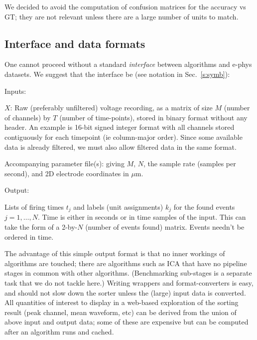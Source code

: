 \documentclass[10pt]{article}
\begin{document}
We decided to avoid the computation of confusion matrices for the accuracy
vs GT; they are not relevant unless there are a large number of units to match.

\subsection{Interface and data formats}
\label{s:int}

One cannot proceed without a
standard {\em interface} between algorithms and e-phys datasets.
We suggest that the interface be (see notation in Sec.~\ref{s:symb}):

\vspace{2ex}

\begin{minipage}[t]{1in}Inputs:\end{minipage} \begin{minipage}[t]{5in}
  $X$: Raw (preferably unfiltered)
  voltage recording, as a matrix of size $M$ (number of channels) by
  $T$ (number of
    time-points), stored in binary format without any header.
  An example is 16-bit signed integer format
  with all channels stored
  contiguously for each timepoint (ie column-major order).
  Since some available data is already filtered, we must also allow
  filtered data in the same format.

  Accompanying parameter file(s): giving $M$, $N$,
  the sample rate (samples per second), and 2D electrode coordinates in $\mu$m.
  \end{minipage}

\begin{minipage}[t]{1in}Output:\end{minipage} \begin{minipage}[t]{5in}
  Lists of firing times $t_j$ and labels (unit assignments) $k_j$
  for the found events $j=1,\ldots,N$. Time is either in seconds or in
  time samples of the input.
  This can take the form of a 2-by-$N$ (number of events found) matrix.
  Events needn't be ordered in time.
\end{minipage}

\vspace{2ex}

The advantage of this simple output format
is that no inner workings of algorithms are touched;
there are algorithms such as ICA that have no pipeline stages
in common with other algorithms. (Benchmarking sub-stages is a separate
task that we do not tackle here.)
Writing wrappers and format-converters is easy, and should not
slow down the sorter unless the (large) input data is converted.
All quantities of interest to display in a web-based exploration
of the sorting result (peak channel, mean waveform, etc)
can be derived from the union of above input and output data;
some of these are expensive but can be computed after an algorithm runs and cached.
\end{document}
